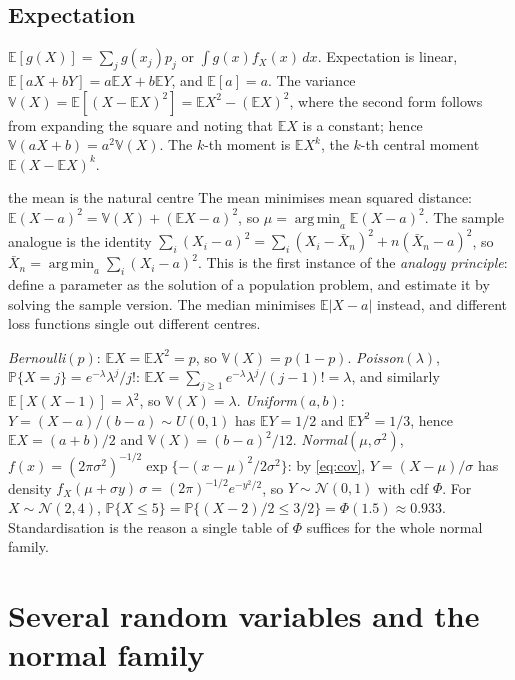 \documentclass[11pt,a4paper]{article}
\newcommand{\E}{\mathbb{E}}
\newcommand{\V}{\mathbb{V}}
\renewcommand{\P}{\mathbb{P}}
\newcommand{\N}{\mathcal{N}}
\newcommand{\Xbar}{\bar X_n}
\DeclareMathOperator*{\argmin}{arg\,min}
\begin{document}
\subsection{Expectation}

$\E[g(X)]=\sum_jg(x_j)p_j$ or $\int g(x)f_X(x)\,dx$. Expectation is linear, $\E[aX+bY]=a\E X+b\E Y$, and $\E[a]=a$. The variance $\V(X)=\E[(X-\E X)^2]=\E X^2-(\E X)^2$, where the second form follows from expanding the square and noting that $\E X$ is a constant; hence $\V(aX+b)=a^2\V(X)$. The $k$-th moment is $\E X^k$, the $k$-th central moment $\E(X-\E X)^k$.

\begin{whybox}{the mean is the natural centre}
The mean minimises mean squared distance: $\E(X-a)^2=\V(X)+(\E X-a)^2$, so $\mu=\argmin_a\E(X-a)^2$. The sample analogue is the identity $\sum_i(X_i-a)^2=\sum_i(X_i-\Xbar)^2+n(\Xbar-a)^2$, so $\Xbar=\argmin_a\sum_i(X_i-a)^2$. This is the first instance of the \emph{analogy principle}: define a parameter as the solution of a population problem, and estimate it by solving the sample version. The median minimises $\E|X-a|$ instead, and different loss functions single out different centres.
\end{whybox}

\begin{example}\label{ex:dists}
\emph{Bernoulli$(p)$}: $\E X=\E X^2=p$, so $\V(X)=p(1-p)$. \emph{Poisson$(\lambda)$}, $\P\{X=j\}=e^{-\lambda}\lambda^j/j!$: $\E X=\sum_{j\ge1}e^{-\lambda}\lambda^j/(j-1)!=\lambda$, and similarly $\E[X(X-1)]=\lambda^2$, so $\V(X)=\lambda$. \emph{Uniform$(a,b)$}: $Y=(X-a)/(b-a)\sim U(0,1)$ has $\E Y=1/2$ and $\E Y^2=1/3$, hence $\E X=(a+b)/2$ and $\V(X)=(b-a)^2/12$. \emph{Normal$(\mu,\sigma^2)$}, $f(x)=(2\pi\sigma^2)^{-1/2}\exp\{-(x-\mu)^2/2\sigma^2\}$: by \eqref{eq:cov}, $Y=(X-\mu)/\sigma$ has density $f_X(\mu+\sigma y)\,\sigma=(2\pi)^{-1/2}e^{-y^2/2}$, so $Y\sim\N(0,1)$ with cdf $\Phi$. For $X\sim\N(2,4)$, $\P\{X\le5\}=\P\{(X-2)/2\le3/2\}=\Phi(1.5)\approx0.933$. Standardisation is the reason a single table of $\Phi$ suffices for the whole normal family.
\end{example}

\section{Several random variables and the normal family}\label{sec:multi}
\end{document}

